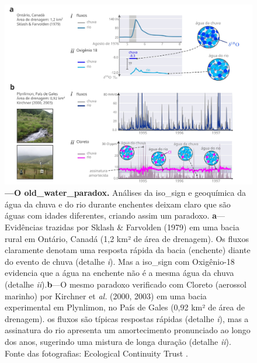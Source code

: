 \documentclass[./main.tex]{subfiles}
\begin{document}
\begin{figure}[t!] 
\centering				
\includegraphics[width=0.98\linewidth]{figs/fig_paradox2.jpg}		
\caption[O paradoxo da água velha]
{\textbf{---\;O \gls{old_water_paradox}.}
    Análises da \gls{iso_sign} e geoquímica da água da chuva e do rio durante enchentes deixam claro que são águas com idades diferentes, criando assim um paradoxo. \;\textbf{a}\;---\;Evidências trazidas por Sklash \& Farvolden (1979) \cite{sklash1979} em uma bacia rural em Ontário, Canadá (1,2 km² de área de drenagem). Os fluxos claramente denotam uma resposta rápida da bacia (enchente) diante do evento de chuva (detalhe \textrm{\textit{i}}). Mas a \gls{iso_sign} com Oxigênio-18 evidencia que a água na enchente não é a mesma água da chuva (detalhe \textrm{\textit{ii}}).\;\textbf{b}\;---\;O mesmo paradoxo verificado com Cloreto (aerossol marinho) por Kirchner et \textit{al.} (2000, 2003) \cite{kirchner2000, Kirchner2003} em uma bacia experimental em Plynlimon, no País de Gales (0,92 km² de área de drenagem). os fluxos são típicas respostas rápidas (detalhe \textrm{\textit{i}}), mas a assinatura do rio apresenta um amortecimento pronunciado ao longo dos anos, sugerindo uma mistura de longa duração (detalhe \textrm{\textit{ii}}). Fonte das fotografias: Ecological Continuity Trust \cite{ect_plynlimon}.
}
\label{fig:hydro:paradox2} 		
\end{figure}
\end{document}
